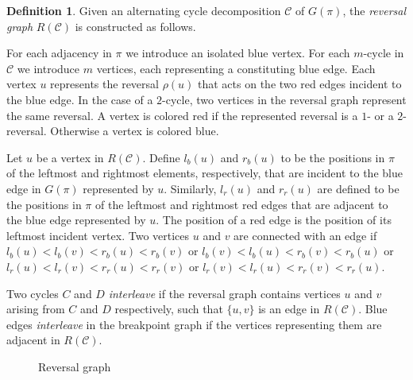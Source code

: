 \documentclass[11pt,DIV=11]{scrartcl}
\theoremstyle{definition}
\newtheorem{definition}[theorem]{Definition}
\theoremstyle{remark}
\begin{document}
\begin{definition}
Given an alternating cycle decomposition $\mathcal{C}$ of $G(\pi)$, the \textit{reversal graph} $R(\mathcal{C})$ is constructed as follows.

For each adjacency in $\pi$ we introduce an isolated blue vertex. For each $m$-cycle in $\mathcal{C}$ we introduce $m$ vertices, each representing a constituting blue edge. Each vertex $u$ represents the reversal $\rho(u)$ that acts on the two red edges incident to the blue edge. In the case of a $2$-cycle, two vertices in the reversal graph represent the same reversal. A vertex is colored red if the represented reversal is a $1$- or a $2$-reversal. Otherwise a vertex is colored blue.

Let $u$ be a vertex in $R(\mathcal{C})$. Define $l_b(u)$ and $r_b(u)$ to be the positions in $\pi$ of the leftmost and rightmost elements, respectively, that are incident to the blue edge in $G(\pi)$ represented by $u$. Similarly, $l_r(u)$ and $r_r(u)$ are defined to be the positions in $\pi$ of the leftmost and rightmost red edges that are adjacent to the blue edge represented by $u$. The position of a red edge is the position of its leftmost incident vertex. Two vertices $u$ and $v$ are connected with an edge if $l_b(u) < l_b(v) < r_b(u) < r_b(v)$ or $l_b(v) < l_b(u) < r_b(v) < r_b(u)$ or $l_r(u) < l_r(v) < r_r(u) < r_r(v)$ or $l_r(v) < l_r(u) < r_r(v) < r_r(u)$.

Two cycles $C$ and $D$ \textit{interleave} if the reversal graph contains vertices $u$ and $v$ arising from $C$ and $D$ respectively, such that $\{u,v\}$ is an edge in $R(\mathcal{C})$. Blue edges \textit{interleave} in the breakpoint graph if the vertices representing them are adjacent in $R(\mathcal{C})$.
\end{definition}

\begin{figure}
    \centering
    \caption{Reversal graph}
    \label{fig:reversal_graph}
\end{figure}
\end{document}

